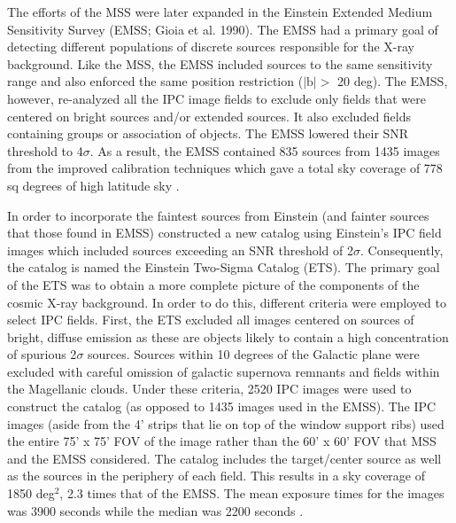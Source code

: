 The efforts of the MSS were later expanded in the Einstein Extended Medium Sensitivity Survey (EMSS; Gioia et al. 1990).
The EMSS had a primary goal of detecting different populations of discrete sources responsible for the X-ray background.
Like the MSS, the EMSS included sources to the same sensitivity range and also enforced the same position restriction ($|\text{b}| >$ 20 deg). 
The EMSS, however, re-analyzed all the IPC image fields to exclude only fields that were centered on bright sources and/or extended sources.
It also excluded fields containing groups or association of objects. 
The EMSS lowered their SNR threshold to 4$\sigma$.  
As a result, the  EMSS contained 835 sources from 1435 images  from the improved calibration techniques which gave a total sky coverage of 778 sq degrees of high latitude sky  \citep{gioia1990}.

In order to incorporate the faintest sources from Einstein (and fainter sources that those found in EMSS) \cite{moran1996} constructed a new catalog using Einstein’s IPC field images which included sources exceeding an SNR threshold of 2$\sigma$.
Consequently, the catalog is named the Einstein Two-Sigma Catalog (ETS).
The primary goal of the ETS was to obtain a more complete picture of the components of the cosmic X-ray background.
In order to do this, different criteria were employed to select IPC fields.
First, the ETS excluded all images centered on sources of bright, diffuse emission as these are objects likely to contain a high concentration of spurious 2$\sigma$ sources.
Sources within 10 degrees of the Galactic plane were excluded with careful omission of galactic supernova remnants and fields within the Magellanic clouds.
Under these criteria, 2520 IPC images were used to construct the catalog (as opposed to 1435 images used in the EMSS). 
The IPC images (aside from the 4’ strips that lie on top of the window support ribs) used the entire 75’ x 75’ FOV of the image rather than the 60’ x 60’ FOV that MSS and the EMSS considered.
The catalog includes the target/center source as well as the sources in the periphery of each field. 
This results in a sky coverage of 1850 deg$^2$, 2.3 times that of the EMSS. 
The mean exposure times for the images was 3900 seconds while the median was 2200 seconds \citep{moran1996} .

